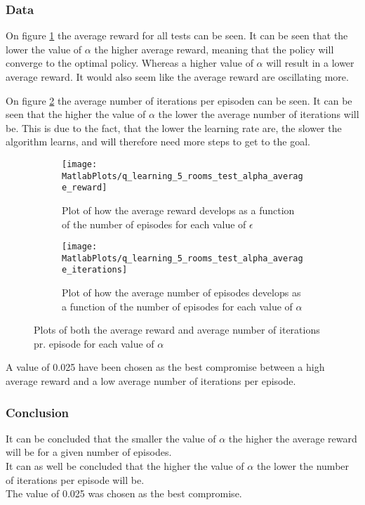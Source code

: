 \documentclass[../Head/Main.tex]{subfiles}
\begin{document}
\clearpage
\subsubsection*{Data}
On figure \ref{fig:q-learn_alpha_reward} the average reward for all tests can be seen. It can be seen that the lower the value of $\alpha$ the higher average reward, meaning that the policy will converge to the optimal policy. Whereas a higher value of $\alpha$ will result in a lower average reward. It would also seem like the average reward are oscillating more.\par
On figure \ref{fig:q-learn_alpha_iterations} the average number of iterations per episoden can be seen. It can be seen that the higher the value of $\alpha$ the lower the average number of iterations will be. This is due to the fact, that the lower the learning rate are, the slower the algorithm learns, and will therefore need more steps to get to the goal.
\begin{figure}[H]
	\centering
	\begin{subfigure}[b]{0.49\textwidth}
		\centering
		\texttt{[image: MatlabPlots/q\_learning\_5\_rooms\_test\_alpha\_average\_reward]}
		\caption{Plot of how the average reward develops as a function of the number of episodes for each value of $\epsilon$}
		\label{fig:q-learn_alpha_reward}
	\end{subfigure}
	\hfill
	\begin{subfigure}[b]{0.49\textwidth}
		\centering
		\texttt{[image: MatlabPlots/q\_learning\_5\_rooms\_test\_alpha\_average\_iterations]}
		\caption{Plot of how the average number of episodes develops as a function of the number of episodes for each value of $\alpha$}
		\label{fig:q-learn_alpha_iterations}
	\end{subfigure}
	\caption{Plots of both the average reward and average number of iterations pr. episode for each value of $\alpha$}
	\label{fig:q-learn_alpha}
\end{figure}
A value of 0.025 have been chosen as the best compromise between a high average reward and a low average number of iterations per episode.

\subsubsection*{Conclusion}
It can be concluded that the smaller the value of $\alpha$ the higher the average reward will be for a given number of episodes.\\
It can as well be concluded that the higher the value of $\alpha$ the lower the number of iterations per episode will be.\\ 
The value of 0.025 was chosen as the best compromise.
\end{document}
